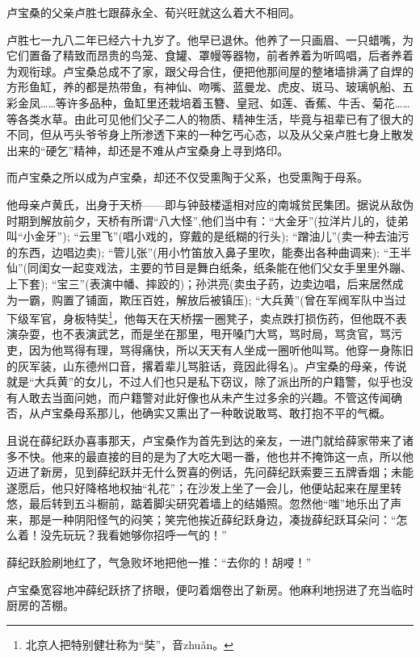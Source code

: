 \par 卢宝桑的父亲卢胜七跟薛永全、荀兴旺就这么着大不相同。
\par 卢胜七一九八二年已经六十九岁了。他早已退休。他养了一只画眉、一只蜡嘴，为它们置备了精致而昂贵的鸟笼、食罐、罩幔等器物，前者养着为听鸣唱，后者养着为观衔球。卢宝桑总成不了家，跟父母合住，便把他那间屋的整堵墙排满了自焊的方形鱼缸，养的都是热带鱼，有神仙、吻嘴、蓝曼龙、虎皮、斑马、玻璃帆船、五彩金凤……等许多品种，鱼缸里还栽培着玉簪、皇冠、如莲、香蕉、牛舌、菊花……等各类水草。由此可见他们父子二人的物质、精神生活，毕竟与祖辈已有了很大的不同，但从丐头爷爷身上所渗透下来的一种乞丐心态，以及从父亲卢胜七身上散发出来的“硬乞”精神，却还是不难从卢宝桑身上寻到烙印。
\par 而卢宝桑之所以成为卢宝桑，却还不仅受熏陶于父系，也受熏陶于母系。
\par 他母亲卢黄氏，出身于天桥——即与钟鼓楼遥相对应的南城贫民集团。据说从敌伪时期到解放前夕，天桥有所谓“八大怪”,他们当中有：“大金牙”(拉洋片儿的，徒弟叫“小金牙”); “云里飞”(唱小戏的，穿戴的是纸糊的行头); “蹭油儿”(卖一种去油污的东西，边唱边卖); “管儿张”(用小竹笛放入鼻子里吹，能奏出各种曲调来); “王半仙”(同闺女一起变戏法，主要的节目是舞白纸条，纸条能在他们父女手里里外蹦、上下套); “宝三”(表演中幡、摔跤的)；孙洪亮(卖虫子药，边卖边唱，后来居然成为一霸，购置了铺面，欺压百姓，解放后被镇压); “大兵黄”(曾在军阀军队中当过下级军官，身板特奘\footnote{北京人把特别健壮称为“奘”，音zhuǎn。}，他每天在天桥摆一圈凳子，卖点跌打损伤药，但他既不表演杂耍，也不表演武艺，而是坐在那里，甩开嗓门大骂，骂时局，骂贪官，骂污吏，因为他骂得有理，骂得痛快，所以天天有人坐成一圈听他叫骂。他穿一身陈旧的灰军装，山东德州口音，撂着辈儿骂脏话，竟因此得名)。卢宝桑的母亲，传说就是“大兵黄”的女儿，不过人们也只是私下窃议，除了派出所的户籍警，似乎也没有人敢去当面问她，而户籍警对此好像也从未产生过多余的兴趣。不管这传闻确否，从卢宝桑母系那儿，他确实又熏出了一种敢说敢骂、敢打抱不平的气概。
\par 且说在薛纪跃办喜事那天，卢宝桑作为首先到达的亲友，一进门就给薛家带来了诸多不快。他来的最直接的目的是为了大吃大喝一番，他也并不掩饰这一点，所以他迈进了新房，见到薛纪跃并无什么贺喜的例话，先问薛纪跃索要三五牌香烟；未能遂愿后，他只好降格地权抽“礼花”；在沙发上坐了一会儿，他便站起来在屋里转悠，最后转到五斗橱前，踮着脚尖研究着墙上的结婚照。忽然他“嗤”地乐出了声来，那是一种阴阳怪气的闷笑；笑完他挨近薛纪跃身边，凑拢薛纪跃耳朵问：“怎么着！没先玩玩？我看她够你招呼一气的！”
\par 薛纪跃脸刷地红了，气急败坏地把他一推：“去你的！胡唚！”
\par 卢宝桑宽容地冲薛纪跃挤了挤眼，便叼着烟卷出了新房。他麻利地拐进了充当临时厨房的苫棚。
